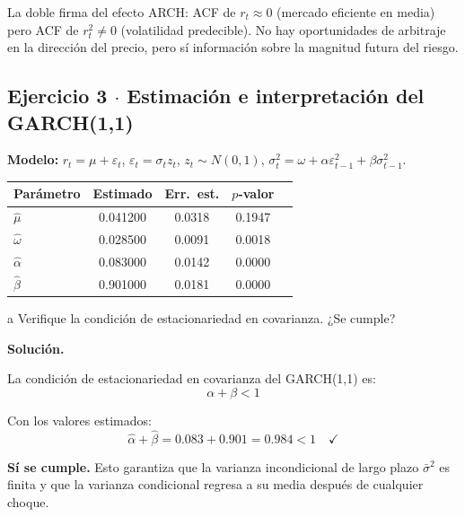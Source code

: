 \documentclass[11pt,a4paper]{article}
\newcommand{\sigmat}{\sigma^2_t}
\newcommand{\sigmabar}{\bar{\sigma}^2}
\newcommand{\eps}{\varepsilon}
\begin{document}
\begin{cajaHallazgo}
La doble firma del efecto ARCH: ACF de $r_t \approx 0$ (mercado eficiente en media) pero ACF de $r_t^2 \neq 0$ (volatilidad predecible). No hay oportunidades de arbitraje en la dirección del precio, pero sí información sobre la magnitud futura del riesgo.
\end{cajaHallazgo}

\subsection*{Ejercicio 3 \texorpdfstring{$\cdot$}{·} Estimación e interpretación del GARCH(1,1)}

\textbf{Modelo:} $r_t = \mu + \eps_t$, $\eps_t = \sigma_t z_t$, $z_t \sim N(0,1)$,
$\sigmat = \omega + \alpha\eps_{t-1}^2 + \beta\sigma_{t-1}^2$.

\begin{center}
\begin{tabular}{@{}lcccc@{}}
\toprule
Parámetro & Estimado & Err.\ est. & $p$-valor \\
\midrule
$\hat{\mu}$ & 0.041200 & 0.0318 & 0.1947 \\
$\hat{\omega}$ & 0.028500 & 0.0091 & 0.0018 \\
$\hat{\alpha}$ & 0.083000 & 0.0142 & 0.0000 \\
$\hat{\beta}$ & 0.901000 & 0.0181 & 0.0000 \\
\bottomrule
\end{tabular}
\end{center}

\begin{cajaInciso}{a}
Verifique la condición de estacionariedad en covarianza. ¿Se cumple?
\end{cajaInciso}

\textbf{Solución.}

La condición de estacionariedad en covarianza del GARCH(1,1) es:
\[
\alpha + \beta < 1
\]

Con los valores estimados:
\[
\hat{\alpha} + \hat{\beta} = 0.083 + 0.901 = 0.984 < 1 \quad \checkmark
\]

\textbf{Sí se cumple.} Esto garantiza que la varianza incondicional de largo plazo $\sigmabar$ es finita y que la varianza condicional regresa a su media después de cualquier choque.
\end{document}
